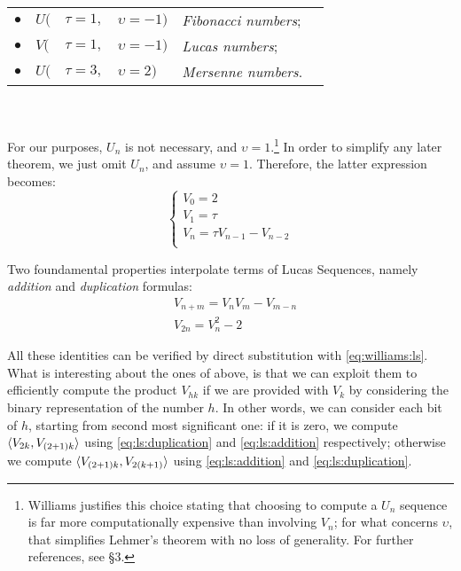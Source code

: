 \begin{tabular}{c l@{\hskip 0pt} l@{\hskip 1pt} l l l}
  $\bullet$ & $U($ & $\tau=1,$ & $\upsilon=-1)$ & \emph{Fibonacci numbers}; \\
  $\bullet$ & $V($ & $\tau=1,$ & $\upsilon=-1)$ & \emph{Lucas numbers}; \\
  $\bullet$ & $U($ & $\tau=3,$ & $\upsilon=2)$ & \emph{Mersenne numbers}.\\
\end{tabular}
\\
\\
For our purposes, $U_n$ is not necessary, and $\upsilon=1$.\footnote{
  Williams justifies this choice stating that choosing to compute a $U_n$ sequence
  is far more computationally expensive than involving $V_n$; for what
  concerns $\upsilon$, that simplifies Lehmer's theorem with no loss of
  generality. For further references,
  see \cite{Williams:p+1} \S 3.}
In order to simplify any later theorem, we just omit $U_n$, and assume $\upsilon
= 1$.
Therefore, the latter expression becomes:
\begin{equation}
  \label{eq:williams:ls}
  \begin{cases}
    V_0 = 2 \\
    V_1 = \tau \\
    V_n = \tau V_{n-1} - V_{n-2} \\
  \end{cases}
\end{equation}

Two foundamental properties interpolate terms of Lucas Sequences, namely
\emph{addition} and \emph{duplication} formulas:
\begin{align}
  & V_{n+m} = V_nV_m - V_{m-n} \label{eq:ls:addition} \\
  & V_{2n} = V_n^2 - 2 \label{eq:ls:duplication}
\end{align}

All these identities can be verified by direct substitution with
\ref{eq:williams:ls}. What is interesting about the ones of above, is that we can
exploit them to efficiently compute the product $V_{hk}$ if we are provided with
$V_k$ by considering the binary representation of the number
$h$. In other words, we can consider each bit of $h$, starting from second most
significant one: if it is zero, we compute $\langle V_{2k}, V_{(2+1)k}\rangle$ using
\ref{eq:ls:duplication} and \ref{eq:ls:addition} respectively; otherwise we
compute $\langle V_{(2+1)k}, V_{2(k+1)}\rangle$ using \ref{eq:ls:addition} and
\ref{eq:ls:duplication}.

